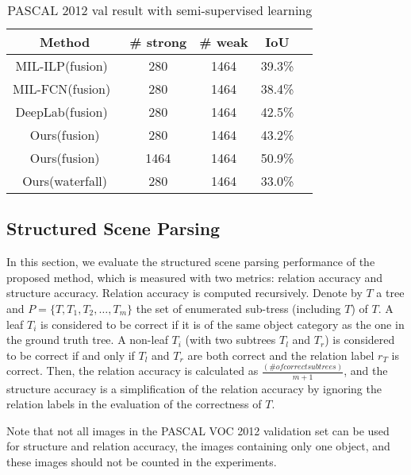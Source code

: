 \documentclass[10pt,twocolumn,letterpaper]{article}
\begin{document}
\begin{table}[!h]\small
\begin{center}
\begin{tabular}{|c|c|c|c|c|}

\hline
Method & \# strong & \# weak & IoU \\
\hline
MIL-ILP(fusion)~\cite{pinheiro2015image} & 280 & 1464 & 39.3\% \\
\hline
MIL-FCN(fusion)~\cite{DBLP:FCnetwork} & 280 & 1464 & 38.4\%\\
\hline
DeepLab(fusion)~\cite{DBLP:WeaklySegmentation} & 280 & 1464 & 42.5\% \\
\hline
Ours(fusion) & 280 & 1464 & 43.2\% \\
\hline
Ours(fusion) & 1464 & 1464 & 50.9\% \\
\hline
Ours(waterfall) & 280 & 1464 & 33.0\% \\
\hline

\end{tabular}
\end{center}
\caption{PASCAL 2012 val result with semi-supervised learning}
\label{tbl:semi_supervision}
\vspace{-3mm}
\end{table}


\subsection{Structured Scene Parsing}
\label{sub:structure_semantic_parsing}

In this section, we evaluate the structured scene parsing performance of the proposed method, which is measured with two metrics: relation accuracy and structure accuracy. Relation accuracy is computed recursively. Denote by $T$ a tree and $P = \{T, T_1, T_2, \ldots, T_m\}$ the set of enumerated sub-tress (including $T$) of $T$. A leaf $T_i$ is considered to be correct if it is of the same object category as the one in the ground truth tree. A non-leaf $T_i$ (with two subtrees $T_l$ and $T_r$) is considered to be correct if and only if $T_l$ and $T_r$ are both correct and the relation label $r_T$ is correct. Then, the relation accuracy is calculated as $\frac{(\# of correct subtrees)}{m+1}$, and the structure accuracy is a simplification of the relation accuracy by ignoring the relation labels in the evaluation of the correctness of $T$.

Note that not all images in the PASCAL VOC 2012 validation set can be used for structure and relation accuracy, \eg the images containing only one object, and these images should not be counted in the experiments.
\end{document}
